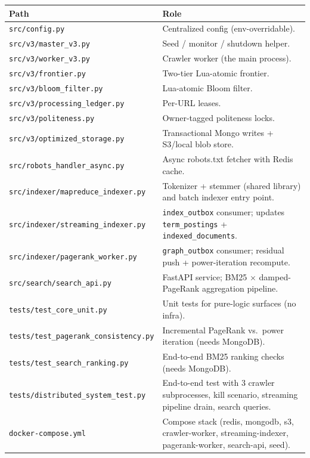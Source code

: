 \documentclass[11pt,a4paper]{article}
\newcommand{\code}[1]{\texttt{#1}}
\begin{document}
\begin{table}[H]
\centering
\small
\begin{tabular}{p{}p{}}
\toprule
Path & Role \\
\midrule
\code{src/config.py} & Centralized config (env-overridable).\\
\code{src/v3/master\_v3.py} & Seed / monitor / shutdown helper.\\
\code{src/v3/worker\_v3.py} & Crawler worker (the main process).\\
\code{src/v3/frontier.py} & Two-tier Lua-atomic frontier.\\
\code{src/v3/bloom\_filter.py} & Lua-atomic Bloom filter.\\
\code{src/v3/processing\_ledger.py} & Per-URL leases.\\
\code{src/v3/politeness.py} & Owner-tagged politeness locks.\\
\code{src/v3/optimized\_storage.py} & Transactional Mongo writes + S3/local blob store.\\
\code{src/robots\_handler\_async.py} & Async robots.txt fetcher with Redis cache.\\
\code{src/indexer/mapreduce\_indexer.py} & Tokenizer + stemmer (shared library) and batch indexer entry point.\\
\code{src/indexer/streaming\_indexer.py} & \code{index\_outbox} consumer; updates \code{term\_postings} + \code{indexed\_documents}.\\
\code{src/indexer/pagerank\_worker.py} & \code{graph\_outbox} consumer; residual push + power-iteration recompute.\\
\code{src/search/search\_api.py} & FastAPI service; BM25 $\times$ damped-PageRank aggregation pipeline.\\
\code{tests/test\_core\_unit.py} & Unit tests for pure-logic surfaces (no infra).\\
\code{tests/test\_pagerank\_consistency.py} & Incremental PageRank vs.\ power iteration (needs MongoDB).\\
\code{tests/test\_search\_ranking.py} & End-to-end BM25 ranking checks (needs MongoDB).\\
\code{tests/distributed\_system\_test.py} & End-to-end test with 3 crawler subprocesses, kill scenario, streaming pipeline drain, search queries.\\
\code{docker-compose.yml} & Compose stack (redis, mongodb, s3, crawler-worker, streaming-indexer, pagerank-worker, search-api, seed).\\

\end{tabular}
\end{table}
\end{document}
